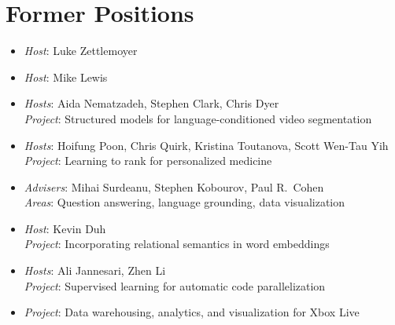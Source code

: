 \section{Former Positions}
\begin{itemize}[leftmargin=-0.4mm,partopsep=0pt,label=]
  \item {}
    \emph{Host}: Luke Zettlemoyer

  \item {}
    \emph{Host}: Mike Lewis

  \item {}
    \emph{Hosts}: Aida Nematzadeh, Stephen Clark, Chris Dyer \\
    \emph{Project}: Structured models for language-conditioned video segmentation

  \item {}
    \emph{Hosts}: Hoifung Poon, Chris Quirk, Kristina Toutanova, Scott Wen-Tau Yih \\
    \emph{Project}: Learning to rank for personalized medicine

  \item {}
    \emph{Advisers}: Mihai Surdeanu, Stephen Kobourov, Paul R.\ Cohen \\
        \emph{Areas}: Question answering, language grounding, data visualization

  \item {}
    \emph{Host}: Kevin Duh \\
    \emph{Project}: Incorporating relational semantics in word embeddings

  \item {}
    \emph{Hosts}: Ali Jannesari, Zhen Li \\
    \emph{Project}: Supervised learning for automatic code parallelization

  \item {}
    \emph{Project}: Data warehousing, analytics, and visualization for Xbox Live
\end{itemize}

